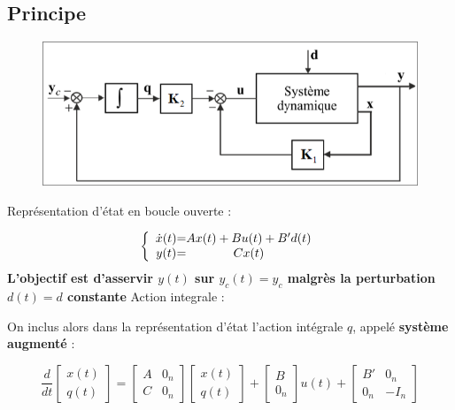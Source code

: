 {{{\subsection{Principe}
\begin{figure}[hbt!]
    \includegraphics[scale=0.5]{Pics/commande_action_integrale.png}
\end{figure}
Représentation d'état en boucle ouverte :
\Large{
    \[
\left \{
\begin{array}{c @{=} c}
    \dot x(t) & Ax(t) + Bu(t) + B'd(t)\\
    y(t) & Cx(t)
\end{array}
\right.
\]
\large{
\textbf{L'objectif est d'asservir $y(t)$ sur $y_{c}(t) = y_{c}$ malgrès la perturbation $d(t) = d$ constante}
Action integrale : }
\begin{center}
    \Large{}
\end{center}
On inclus alors dans la représentation d'état l'action intégrale $q$, appelé \textbf{système augmenté} : 
\begin{center}
    \[
    \frac{d}{dt}
    \begin{bmatrix}
        x(t) \\
        q(t)
    \end{bmatrix}
    =
    \begin{bmatrix}
        A & 0_{n} \\
        C & 0_{n}
    \end{bmatrix}
    \begin{bmatrix}
        x(t) \\
        q(t)
    \end{bmatrix}
    +
    \begin{bmatrix}
        B \\
        0_{n}
    \end{bmatrix}
    u(t) +
    \begin{bmatrix}
        B' & 0_{n} \\
        0_{n} & - I_{n}

\end{bmatrix}\]
\end{center}}}}}
